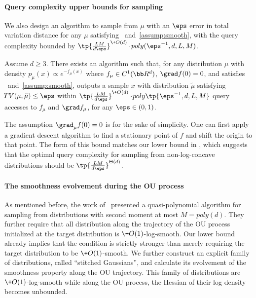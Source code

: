 \documentclass[11pt,a4paper]{article}
\newcommand{\DTV}{\!{TV}}
\begin{document}

\paragraph{Query complexity upper bounds for sampling}
We also design an algorithm to sample from $\mu$ with an $\eps$ error in total variation distance for any $\mu$ satisfying ~and~\ref{assump:smooth}, with the query complexity bounded by $\tp{\frac{LM}{d\eps}}^{\+O(d)}\cdot \!{poly}(\eps^{-1},d,L,M)$. %
\begin{theorem}\label{thm:main-ub}
    Assume $d\ge 3$. There exists an algorithm such that, for any distribution $\mu$ with density $p_\mu(x)\propto e^{-f_\mu(x)}$ where $f_\mu\in C^1(\bb R^d)$, $\grad f(0)=0$, and satisfies ~and~\ref{assump:smooth}, outputs a sample $x$ with distribution $\tilde \mu$ satisfying $\DTV(\mu,\tilde \mu)\le \eps$ within $\tp{\frac{LM}{d\eps}}^{\+O(d)}\cdot \!{poly}\tp{\eps^{-1},d,L,M}$ query accesses to $f_\mu$ and $\grad f_\mu$, for any $\eps\in (0,1)$. 
\end{theorem}
The assumption $\grad_\mu f(0)=0$ is for the sake of simplicity. One can first apply a gradient descent algorithm to find a stationary point of $f$ and shift the origin to that point. The form of this bound matches our lower bound in , which suggests that the optimal query complexity for sampling from non-log-concave distributions should be $\tp{\frac{LM}{d\eps}}^{\Theta(d)}$. 

\paragraph{The smoothness evolvement during the OU process}

As mentioned before, the work of~\cite{HZD+24} presented a quasi-polynomial algorithm for sampling from distributions with second moment at most $M=\!{poly}(d)$. They further require that all distribution along the trajectory of the OU process initialized at the target distribution is $\+O(1)$-log-smooth. Our lower bound already implies that the condition is strictly stronger than merely requiring the target distribution to be $\+O(1)$-smooth. We further construct an explicit family of distributions, called ``stitched Gaussians'', and calculate its evolvement of the smoothness property along the OU trajectory. This family of distributions are $\+O(1)$-log-smooth while along the OU process, the Hessian of their log density becomes unbounded.
\end{document}
